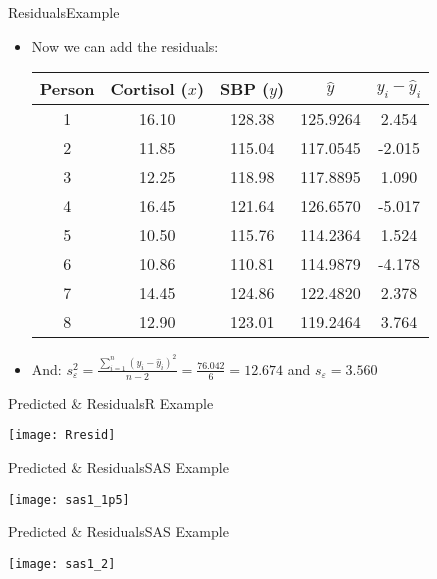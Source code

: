 \documentclass[xcolor=dvipsnames]{beamer}
\begin{document}
\begin{frame}{Residuals}{Example}
	\begin{itemize}
		\item Now we can add the residuals: \pause
		\vspace{1mm}
		\begin{center}
			\begin{tabular}{ccccc}
				\hline
				Person& Cortisol ($x$) & SBP ($y$)  & $\hat{y}$ & $y_i - \hat{y}_i$ \\ 
				\hline
				1 & 16.10 & 128.38  & 125.9264 & 2.454\\ 
				2 & 11.85 & 115.04  & 117.0545 & -2.015\\ 
				3 & 12.25 & 118.98  & 117.8895 & 1.090\\ 
				4 & 16.45 & 121.64  & 126.6570 & -5.017\\ 
				5 & 10.50 & 115.76  & 114.2364 & 1.524\\ 
				6 & 10.86 & 110.81  & 114.9879 & -4.178\\ 
				7 & 14.45 & 124.86  & 122.4820 & 2.378\\ 
				8 & 12.90 & 123.01  & 119.2464 &  3.764\\ 
				\hline
			\end{tabular}
		\end{center} \pause
	\vspace{1mm}
	\item And: 	$s^2_{\varepsilon} = \frac{\sum_{i=1}^{n}\left(y_i - \hat{y}_i\right)^2}{n-2} = \frac{76.042}{6} = 12.674$ and $s_{\varepsilon}=3.560$
	\end{itemize}
\end{frame}

\begin{frame}{Predicted \& Residuals}{R Example}
	\begin{center}
		\texttt{[image: Rresid]}
	\end{center}
\end{frame}

\begin{frame}{Predicted \& Residuals}{SAS Example}
	\begin{center}
		\texttt{[image: sas1\_1p5]}
	\end{center}
\end{frame}

\begin{frame}{Predicted \& Residuals}{SAS Example}
	\begin{center}
		\texttt{[image: sas1\_2]}
	\end{center}
\end{frame}
\end{document}
